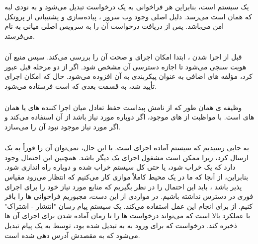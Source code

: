  یک سیستم  است، بنابراین هر فراخوانی  به یک درخواست  تبدیل می‌شود و به نود‌ی لبه که همان  است می‌رسد. دلیل اصلی وجود وب سرور ، پیاده‌سازی و پشتیبانی از پروتکل امن  می‌باشد.  پس از دریافت درخواست آن را به سرویس اصلی میانی به نام  می‌فرستد.

\subsubsection*{}

قبل از اجرا شدن ، ابتدا  امکان اجرای و صحت آن را بررسی می‌کند. سپس منبع آن هویت سنجی می‌شود تا اجازه دسترسی آن مشخص شود. اگر  از دو مرحله قبل عبور کرد، مؤلفه های اضافی به عنوان پیکربندی به آن افزوده می‌شود. حال که امکان اجرای  تأیید شد، به قسمت بعدی که  است فرستاده می‌شود.

\subsubsection*{}

وظیفه ی  همان طور که از نامش پیداست حفظ تعادل میان اجرا کننده های  یا همان  های  است.  با مواظبت از  های  موجود، اگر دوباره مورد نیاز باشد از آن استفاده می‌کند و اگر  مورد نیاز موجود نبود آن را می‌سازد.

\subsubsection*{}

به جایی رسیدیم که سیستم آماده اجرای  است. با این حال، نمی‌توان آن  را فوراً به یک  ارسال کرد، زیرا ممکن است مشغول اجرای یک  دیگر باشد. همچنین این احتمال وجود دارد که یک  خراب شود، یا حتی کل سیستم خراب شده و دوباره راه اندازی شود. بنابراین، از آنجا که ما در یک محیط کاملاً موازی کار می‌کنیم که انتظار می‌رود مقیاس پذیر باشد ، باید این احتمال را در نظر بگیریم که منابع مورد نیاز خود را برای اجرای فوری  در دسترس نداشته باشیم. در مواردی از این دست، مجبوریم فراخوانی ها را بافر کنیم.  از  برای انجام این عمل استفاده می‌کند.  یک سیستم پیام رسان "انتشار - اشتراک" با عملکرد بالا است که می‌تواند درخواست ها را تا زمان آماده شدن برای اجرای آن ها ذخیره کند. درخواست که برای ورود به  به  تبدیل شده بود، توسط  به یک پیام  تبدیل می‌شود که به  مقصدش آدرس دهی شده است.

